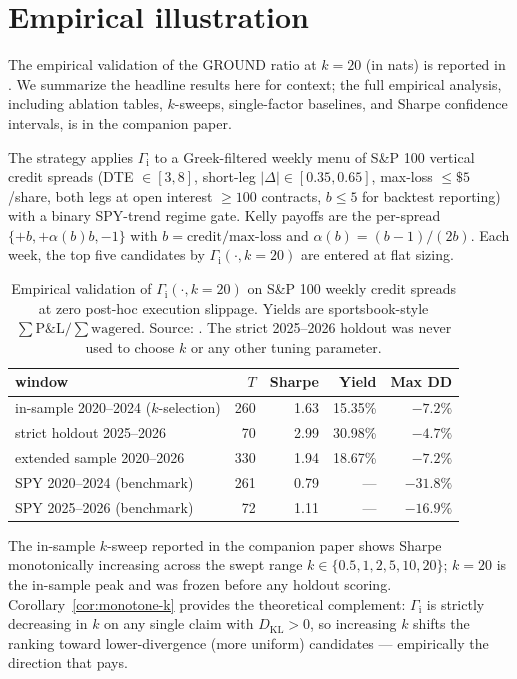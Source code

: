 \documentclass[11pt]{article}
\theoremstyle{definition}
\theoremstyle{remark}
\newcommand{\KL}{D_{\mathrm{KL}}}
\newcommand{\GROUND}{\Gamma_{\mathrm{i}}}
\begin{document}
\section{Empirical illustration}\label{sec:empirical}

The empirical validation of the GROUND ratio at $k = 20$ (in nats)
is reported in \citet{mercurio2026empirical}. We summarize the
headline results here for context; the full empirical analysis,
including ablation tables, $k$-sweeps, single-factor baselines, and
Sharpe confidence intervals, is in the companion paper.

The strategy applies $\GROUND$ to a Greek-filtered weekly menu of
S\&P 100 vertical credit spreads (DTE $\in [3, 8]$, short-leg
$|\Delta| \in [0.35, 0.65]$, max-loss $\le \$5$/share, both legs at
open interest $\ge 100$ contracts, $b \le 5$ for backtest reporting)
with a binary SPY-trend regime gate. Kelly payoffs are the per-spread
$\{+b, +\alpha(b) b, -1\}$ with $b = \text{credit}/\text{max-loss}$
and $\alpha(b) = (b-1)/(2b)$. Each week, the top five candidates by
$\GROUND(\cdot, k{=}20)$ are entered at flat sizing.

\begin{table}[htbp]
\centering
\small
\begin{tabular}{lrrrr}
\toprule
window & $T$ & Sharpe & Yield & Max DD \\
\midrule
in-sample 2020--2024 ($k$-selection) & 260 & 1.63 & 15.35\% & $-7.2\%$  \\
strict holdout 2025--2026             &  70 & 2.99 & 30.98\% & $-4.7\%$  \\
extended sample 2020--2026            & 330 & 1.94 & 18.67\% & $-7.2\%$  \\
\midrule
SPY 2020--2024 (benchmark)            & 261 & 0.79 & ---     & $-31.8\%$ \\
SPY 2025--2026 (benchmark)            &  72 & 1.11 & ---     & $-16.9\%$ \\
\bottomrule
\end{tabular}
\caption{Empirical validation of $\GROUND(\cdot, k{=}20)$ on S\&P 100 weekly
credit spreads at zero post-hoc execution slippage. Yields are
sportsbook-style $\sum \mathrm{P\&L} / \sum \mathrm{wagered}$. Source:
\citet{mercurio2026empirical}. The strict 2025--2026 holdout was never
used to choose $k$ or any other tuning parameter.}
\label{tab:empirical}
\end{table}

The in-sample $k$-sweep reported in the companion paper shows Sharpe
monotonically increasing across the swept range $k \in \{0.5, 1, 2, 5,
10, 20\}$; $k = 20$ is the in-sample peak and was frozen before any
holdout scoring. Corollary~\ref{cor:monotone-k} provides the
theoretical complement: $\GROUND$ is strictly decreasing in $k$ on any
single claim with $\KL > 0$, so increasing $k$ shifts the ranking
toward lower-divergence (more uniform) candidates --- empirically the
direction that pays.
\end{document}
